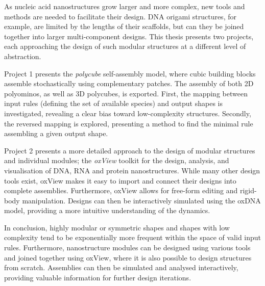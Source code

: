 
As nucleic acid nanostructures grow larger and more complex, new tools and methods are needed to facilitate their design. DNA origami structures, for example, are limited by the lengths of their scaffolds, but can they be joined together into larger multi-component designs. This thesis presents two projects, each approaching the design of such modular structures at a different level of abstraction.

Project 1 presents the \emph{polycube} self-assembly model, where cubic building blocks assemble stochastically using complementary patches. The assembly of both 2D polyominos, as well as 3D polycubes, is exported. First, the mapping between input rules (defining the set of available species) and output shapes is investigated, revealing a clear bias toward low-complexity structures. Secondly, the reversed mapping is explored, presenting a method to find the minimal rule assembling a given output shape.

Project 2 presents a more detailed approach to the design of modular structures and individual modules; the \emph{oxView} toolkit for the design, analysis, and visualisation of DNA, RNA and protein nanostructures. While many other design tools exist, oxView makes it easy to import and connect their designs into complete assemblies. Furthermore, oxView allows for free-form editing and rigid-body manipulation. Designs can then be interactively simulated using the oxDNA model, providing a more intuitive understanding of the dynamics.

In conclusion, highly modular or symmetric shapes and shapes with low complexity tend to be exponentially more frequent within the space of valid input rules. Furthermore, nanostructure modules can be designed using various tools and joined together using oxView, where it is also possible to design structures from scratch. Assemblies can then be simulated and analysed interactively, providing valuable information for further design iterations.